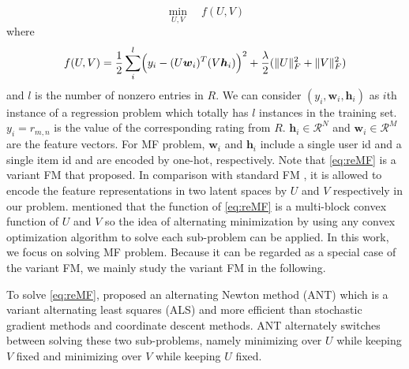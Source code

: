 \documentclass[11pt,twoside]{article}
\newcommand{\bsym}[1]{\ensuremath{\boldsymbol{#1}}}
\newcommand{\bw}{\ensuremath{\bsym{w}}}
\newcommand{\bh}{\ensuremath{\bsym{h}}}
\newcommand{\bbr}{\ensuremath{\mathcal R}}
\begin{document}
\begin{equation}
\min_{U, V} \quad f(U, V)\label{eq:reMF}
\end{equation}
where 
\begin{equation}
    f(U, V) = \frac{1}{2}\sum_{i}^l  \Bigl(y_i - (U \bw_i)^T (V \bh_i)\Bigr)^2+
    \frac{\lambda}{2} (\|U\|^2_F +\|V\|^2_F	)
    \label{eq:min_reMF}
\end{equation}
and $l$ is the number of nonzero entries in $R$. We can consider $(y_i, \bw_i, \bh_i)$ as $i$th instance of a regression problem which totally has $l$ instances in the training set.
$y_i=r_{m, n}$ is the value of the corresponding rating from $R$. $\bh_i \in \bbr^N $ and $\bw_i \in \bbr^M$ are the feature vectors. For MF problem, $\bw_i$ and $\bh_i$  include a single user id and a single item id and are encoded by one-hot, respectively.  
Note that \eqref{eq:reMF} is a variant FM that \citet{MB16a} proposed. 
In comparison with standard FM \citep{SR10c}, 
it is allowed to encode the feature representations in two latent spaces by $U$ and $V$ respectively in our problem. 
\citet{MB16a} mentioned that the function of \eqref{eq:reMF} is a multi-block convex function of $U$ and $V$ so the idea of alternating minimization by using any convex optimization algorithm to solve each sub-problem can be applied. In this work, we focus on solving MF problem. Because it can be regarded as a special case of the variant FM, we mainly study the variant FM in the following.


To solve \eqref{eq:reMF}, \citet{test17a} proposed an alternating Newton method (ANT) which is a variant alternating least squares (ALS) and more efficient than stochastic gradient methods and coordinate descent methods. ANT alternately switches between solving these two sub-problems, namely minimizing over $U$ while keeping $V$ fixed and minimizing over $V$ while keeping $U$ fixed. 
\end{document}
